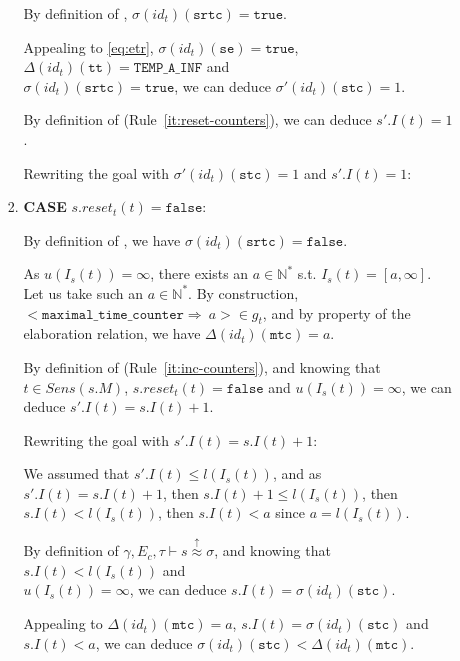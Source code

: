 \documentclass[dvipsnames,12pt]{article}
\begin{document}
\begin{niproof}
\begin{enumerate}
\begin{enumerate}
\begin{enumerate}
        By definition of \upSim, $\sigma(id_t)(\texttt{srtc})=\mathtt{true}$.

        Appealing to \eqref{eq:etr},
        $\sigma(id_t)(\texttt{se})=\mathtt{true}$,
        $\Delta(id_t)(\texttt{tt})=\mathtt{TEMP\_A\_INF}$ and\\
        $\sigma(id_t)(\texttt{srtc})=\mathtt{true}$, we can deduce
        $\sigma'(id_t)(\texttt{stc})=1$.

        By definition of \dwSitpn (Rule~\ref{it:reset-counters}), we
        can deduce $s'.I(t)=1$.

        Rewriting the goal with $\sigma'(id_t)(\texttt{stc})=1$ and
        $s'.I(t)=1$: 

      \item \textbf{CASE} $s.reset_t(t)=\mathtt{false}$:
        
        By definition of \upSim, we have
        $\sigma(id_t)(\texttt{srtc})=\mathtt{false}$.

        As $u(I_s(t))=\infty$, there exists an
        $a\in\mathbb{N}^{*}$ s.t. $I_s(t)=[a,\infty]$. Let us take
        such an $a\in\mathbb{N}^{*}$. By construction,
        ${<}\mathtt{maximal\_time\_counter\Rightarrow}~a{>}\in{}g_t$,
        and by property of the elaboration relation, we have
        $\Delta(id_t)(\texttt{mtc})=a$.

        By definition of \dwSitpn (Rule~\ref{it:inc-counters}), and
        knowing that $t\in{}Sens(s.M)$, $s.reset_t(t)=\mathtt{false}$
        and $u(I_s(t))=\infty$, we can deduce $s'.I(t)=s.I(t)+1$.

        Rewriting the goal with $s'.I(t)=s.I(t)+1$:
        
        We assumed that $s'.I(t)\le{}l(I_s(t))$, and as
        $s'.I(t)=s.I(t)+1$, then $s.I(t)+1\le{}l(I_s(t))$, then
        $s.I(t)<l(I_s(t))$, then $s.I(t)<a$ since
        $a=l(I_s(t))$.

        \noindent{}By definition of
        $\gamma,E_c,\tau\vdash{}s\stackrel{\uparrow}{\approx}\sigma$,
        and knowing that $s.I(t)<l(I_s(t))$ and\\
        $u(I_s(t))=\infty$, we can deduce
        $s.I(t)=\sigma(id_t)(\texttt{stc})$.

        Appealing to $\Delta(id_t)(\texttt{mtc})=a$,
        $s.I(t)=\sigma(id_t)(\texttt{stc})$ and $s.I(t)<a$, we can deduce
        $\sigma(id_t)(\texttt{stc})<\Delta(id_t)(\texttt{mtc})$.
        

\end{enumerate}
\end{enumerate}
\end{enumerate}
\end{niproof}
\end{document}
